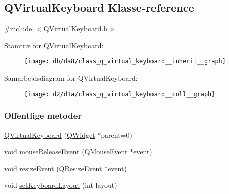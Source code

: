 \hypertarget{class_q_virtual_keyboard}{}\subsection{Q\+Virtual\+Keyboard Klasse-\/reference}
\label{class_q_virtual_keyboard}


{\ttfamily \#include $<$Q\+Virtual\+Keyboard.\+h$>$}



Stamtræ for Q\+Virtual\+Keyboard\+:\nopagebreak
\begin{figure}[H]
\begin{center}
\leavevmode
\texttt{[image: db/da8/class\_q\_virtual\_keyboard\_\_inherit\_\_graph]}
\end{center}
\end{figure}


Samarbejdsdiagram for Q\+Virtual\+Keyboard\+:\nopagebreak
\begin{figure}[H]
\begin{center}
\leavevmode
\texttt{[image: d2/d1a/class\_q\_virtual\_keyboard\_\_coll\_\_graph]}
\end{center}
\end{figure}
\subsubsection*{Offentlige metoder}
\begin{DoxyCompactItemize}
\item 
\hyperlink{class_q_virtual_keyboard_afc7b26ae7bb5c5dbf3180e1772e93541}{Q\+Virtual\+Keyboard} (\hyperlink{class_q_widget}{Q\+Widget} $\ast$parent=0)
\item 
void \hyperlink{class_q_virtual_keyboard_a35226f6549add1ff837c65888fcd00fc}{mouse\+Release\+Event} (Q\+Mouse\+Event $\ast$event)
\item 
void \hyperlink{class_q_virtual_keyboard_a6fbc07cec19868c41d513b9ef8343e9a}{resize\+Event} (Q\+Resize\+Event $\ast$event)
\item 
void \hyperlink{class_q_virtual_keyboard_a246743b8e5e49a9faaa175cd15dd6f4c}{set\+Keyboard\+Layout} (int layout)
\end{DoxyCompactItemize}
